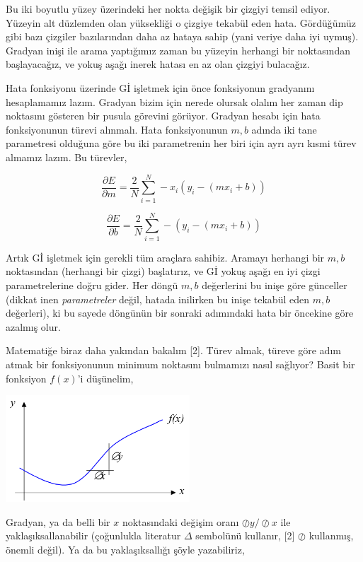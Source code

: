 \documentclass[12pt,fleqn]{article}\usepackage{../../common}
\begin{document}
Bu iki boyutlu yüzey üzerindeki her nokta değişik bir çizgiyi temsil
ediyor. Yüzeyin alt düzlemden olan yüksekliği o çizgiye tekabül eden
hata. Gördüğümüz gibi bazı çizgiler bazılarından daha az hataya sahip (yani
veriye daha iyi uymuş). Gradyan inişi ile arama yaptığımız zaman bu yüzeyin
herhangi bir noktasından başlayacağız, ve yokuş aşağı inerek hatası en az olan
çizgiyi bulacağız.

Hata fonksiyonu üzerinde Gİ işletmek için önce fonksiyonun gradyanını
hesaplamamız lazım. Gradyan bizim için nerede olursak olalım her zaman dip
noktasını gösteren bir pusula görevini görüyor. Gradyan hesabı için hata
fonksiyonunun türevi alınmalı. Hata fonksiyonunun $m,b$ adında iki tane
parametresi olduğuna göre bu iki parametrenin her biri için ayrı ayrı kısmi
türev almamız lazım. Bu türevler,

$$ 
\frac{\partial E}{\partial m} =
\frac{2}{N} \sum_{i=1}^{N} -x_i (y_i - (mx_i+b))
$$

$$ 
\frac{\partial E}{\partial b} =
\frac{2}{N} \sum_{i=1}^{N} -(y_i - (mx_i+b))
$$

Artık Gİ işletmek için gerekli tüm araçlara sahibiz. Aramayı herhangi bir $m,b$
noktasından (herhangi bir çizgi) başlatırız, ve Gİ yokuş aşağı en iyi çizgi
parametrelerine doğru gider. Her döngü $m,b$ değerlerini bu inişe göre günceller
(dikkat inen {\em parametreler} değil, hatada inilirken bu inişe tekabül eden
$m,b$ değerleri), ki bu sayede döngünün bir sonraki adımındaki hata bir öncekine
göre azalmış olur.

Matematiğe biraz daha yakından bakalım [2]. Türev almak, türeve göre adım atmak
bir fonksiyonunun minimum noktasını bulmamızı nasıl sağlıyor? Basit bir
fonksiyon $f(x)$'i düşünelim, 

\includegraphics[height=4cm]{vision_90fitting_05.png}

Gradyan, ya da belli bir $x$ noktasındaki değişim oranı $\oslash y / \oslash x$
ile yaklaşıksallanabilir (çoğunlukla literatur $\Delta$ sembolünü kullanır, [2]
$\oslash$ kullanmış, önemli değil). Ya da bu yaklaşıksallığı şöyle yazabiliriz,
\end{document}
